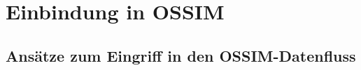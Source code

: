 \section{Einbindung in OSSIM}

\label{sec_impl_integration_into_ossim}

\subsection*{Ansätze zum Eingriff in den OSSIM-Datenfluss}